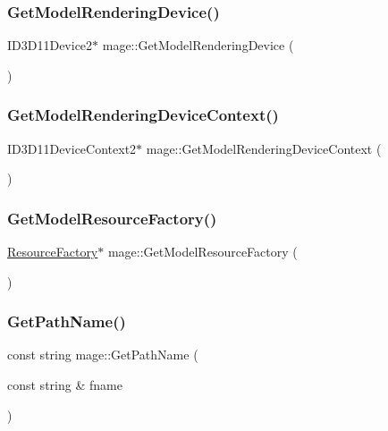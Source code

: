 \subsubsection{\texorpdfstring{Get\+Model\+Rendering\+Device()}{GetModelRenderingDevice()}}
{\footnotesize\ttfamily I\+D3\+D11\+Device2$\ast$ mage\+::\+Get\+Model\+Rendering\+Device (\begin{DoxyParamCaption}{ }\end{DoxyParamCaption})}

\hypertarget{namespacemage_a1d373a08e09ec19944bf23feb4688b7e}{}\label{namespacemage_a1d373a08e09ec19944bf23feb4688b7e} 
\subsubsection{\texorpdfstring{Get\+Model\+Rendering\+Device\+Context()}{GetModelRenderingDeviceContext()}}
{\footnotesize\ttfamily I\+D3\+D11\+Device\+Context2$\ast$ mage\+::\+Get\+Model\+Rendering\+Device\+Context (\begin{DoxyParamCaption}{ }\end{DoxyParamCaption})}

\hypertarget{namespacemage_a51b4df46661a9038c0d2a14cb3fbe483}{}\label{namespacemage_a51b4df46661a9038c0d2a14cb3fbe483} 
\subsubsection{\texorpdfstring{Get\+Model\+Resource\+Factory()}{GetModelResourceFactory()}}
{\footnotesize\ttfamily \hyperlink{classmage_1_1_resource_factory}{Resource\+Factory}$\ast$ mage\+::\+Get\+Model\+Resource\+Factory (\begin{DoxyParamCaption}{ }\end{DoxyParamCaption})}

\hypertarget{namespacemage_ab3642c6ef6cf94a62fb37b40c3c2f57e}{}\label{namespacemage_ab3642c6ef6cf94a62fb37b40c3c2f57e} 
\subsubsection{\texorpdfstring{Get\+Path\+Name()}{GetPathName()}\hspace{0.1cm}{\footnotesize\ttfamily [1/2]}}
{\footnotesize\ttfamily const string mage\+::\+Get\+Path\+Name (\begin{DoxyParamCaption}\item[{const string \&}]{fname }\end{DoxyParamCaption})}

